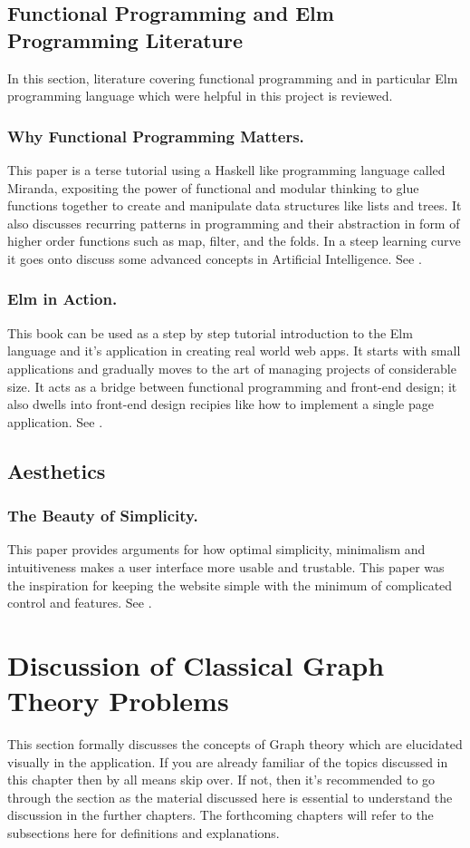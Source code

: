 \subsection{Functional Programming and Elm Programming Literature}
In this section, literature covering functional programming and in particular
Elm programming language which were helpful in this project is reviewed.

\subsubsection{Why Functional Programming Matters.}
This paper is a terse tutorial using a Haskell like programming language called
Miranda, expositing the power of functional and modular thinking to glue
functions together to create and manipulate data structures like lists and
trees. It also discusses recurring patterns in programming and their
abstraction in form of higher order functions such as map, filter, and the
folds. In a steep learning curve it goes onto discuss some advanced concepts
in Artificial Intelligence. See \cite{Hughes89}.

\subsubsection{Elm in Action.}
This book can be used as a step by step tutorial introduction to the Elm
language and it's application in creating real world web apps. It starts with
small applications and gradually moves to the art of managing projects of
considerable size. It acts as a bridge between functional programming and
front-end design; it also dwells into front-end design recipies like how to
implement a single page application. See \cite{feldman2020elm}.

\subsection{Aesthetics}
\subsubsection{The Beauty of Simplicity.}
This paper provides arguments for how optimal simplicity, minimalism and
intuitiveness makes a user interface more usable and trustable. This paper was
the inspiration for keeping the website simple with the minimum of complicated
control and features. See \cite{Karvonen2000}.

\section{Discussion of Classical Graph Theory Problems}
This section formally discusses the concepts of Graph theory which are
elucidated visually in the application. If you are already familiar of the
topics discussed in this chapter then by all means skip over.  If not, then
it's recommended to go through the section as the material discussed here is
essential to understand the discussion in the further chapters.  The
forthcoming chapters will refer to the subsections here for definitions and
explanations.


